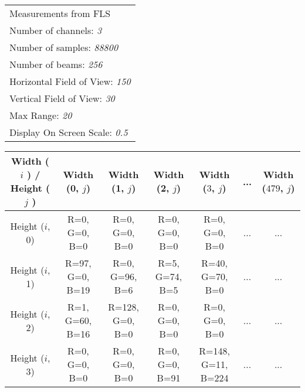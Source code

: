 \documentclass[]{article}
\begin{document}
    \begin{table}[H]
    	\begin{flushleft}
    		\begin{tabular}{l}
    			\toprule 
    			\footnotesize Measurements from FLS \\
    			\footnotesize Number of channels: \textit{3} \\
    			\footnotesize Number of samples: \textit{88800} \\
    			\footnotesize Number of beams: \textit{256} \\
    			\footnotesize Horizontal Field of View: \textit{150} \\
    			\footnotesize Vertical Field of View: \textit{30} \\
    			\footnotesize Max Range: \textit{20} \\
    			\footnotesize Display On Screen Scale: \textit{0.5}
    		\end{tabular}
    		
    	\end{flushleft}
    	\begin{center}
    		\begin{tabular}{ccccccc}
    			\toprule
    			\footnotesize Width ( $i$ ) / Height ( $j$ ) 
    			& \footnotesize Width (0, $j$) &	\footnotesize Width (1, $j$) &	\footnotesize Width (2, $j$) &	\footnotesize Width ($3$, $j$) & ... & \footnotesize Width ($479$, $j$) \\
    			
    			\midrule
    			
    			\footnotesize Height ($i$, 0) & \scriptsize R=0, G=0, B=0 & \scriptsize R=0, G=0, B=0 & \scriptsize R=0, G=0, B=0 & \scriptsize R=0, G=0, B=0 & ... & ... \\
    			
    			\footnotesize Height ($i$, 1) & \scriptsize R=97, G=0, B=19 & \scriptsize R=0, G=96, B=6 & \scriptsize R=5, G=74, B=5 & \scriptsize R=40, G=70, B=0 & ...& ...  \\
    			
    			\footnotesize Height ($i$, 2) & \scriptsize R=1, G=60, B=16 & \scriptsize R=128, G=0, B=0 & \scriptsize R=0, G=0, B=0 & \scriptsize R=0, G=0, B=0 & ... & ...\\
    			
    			\footnotesize Height ($i$, 3) & \scriptsize R=0, G=0, B=0 & \scriptsize R=0, G=0, B=0 & \scriptsize R=0, G=0, B=91 & \scriptsize R=148, G=11, B=224 & ... & ...\\
    			

\end{tabular}
\end{center}
\end{table}
\end{document}

